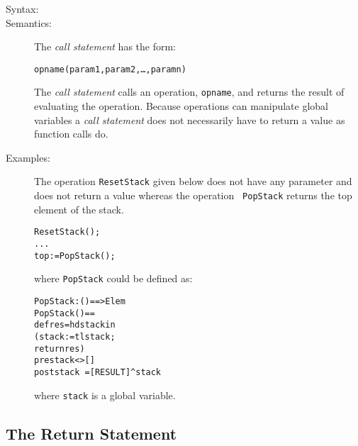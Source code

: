 \documentclass[\pformat,12pt]{article}
\begin{document}
\begin{description}
\item[Syntax:]

\item[Semantics:] The {\it call statement} has the form:
  \begin{alltt}
    opname(param1, param2, \ldots, paramn)
  \end{alltt}


  The {\it call statement} calls an operation, {\tt opname}, %
and returns the result of
  evaluating the operation. Because operations can manipulate global
  variables a {\it call statement} does not necessarily have to return
  a value as function calls do.


\item[Examples:] \mbox{} 
  The operation {\tt ResetStack} given below does not
  have any parameter and does not return a value whereas the operation {\tt
    PopStack} returns the top element of the stack.
  \begin{alltt}
    ResetStack();
    ...
    top := PopStack();
  \end{alltt}
  where {\tt PopStack} could be defined as:
  \begin{alltt}
    PopStack: () ==> Elem
    PopStack() ==
      def res = hd stack in
       (stack := tl stack;
        return res)
    pre stack <> []
    post stack~ = [RESULT] ^ stack
  \end{alltt}
  where {\tt stack} is a global variable.

\end{description}

\subsection{The Return Statement}
\end{document}
